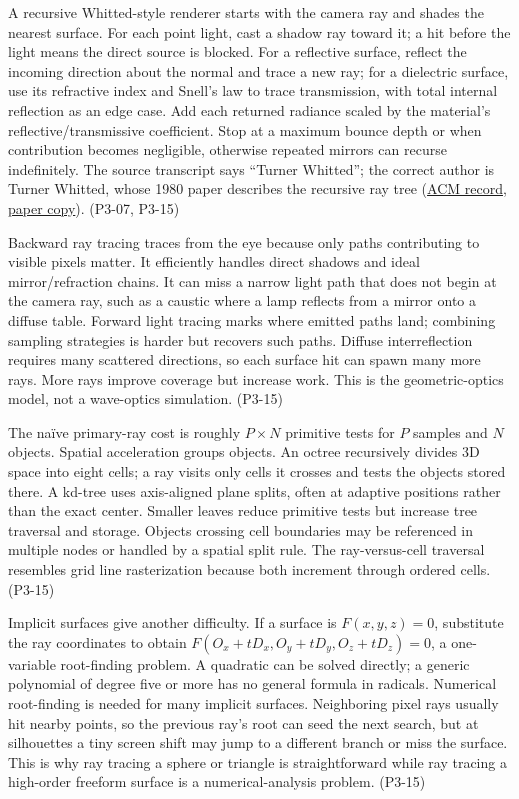 A recursive Whitted-style renderer starts with the camera ray and shades the nearest surface. For each point light, cast a shadow ray toward it; a hit before the light means the direct source is blocked. For a reflective surface, reflect the incoming direction about the normal and trace a new ray; for a dielectric surface, use its refractive index and Snell's law to trace transmission, with total internal reflection as an edge case. Add each returned radiance scaled by the material's reflective/transmissive coefficient. Stop at a maximum bounce depth or when contribution becomes negligible, otherwise repeated mirrors can recurse indefinitely. The source transcript says ``Turner Whitted''; the correct author is Turner Whitted, whose 1980 paper describes the recursive ray tree (\href{https://doi.org/10.1145/358876.358882}{ACM record}, \href{https://my.eng.utah.edu/~cs6958/papers/p343-whitted.pdf}{paper copy}). (P3-07, P3-15)

Backward ray tracing traces from the eye because only paths contributing to visible pixels matter. It efficiently handles direct shadows and ideal mirror/refraction chains. It can miss a narrow light path that does not begin at the camera ray, such as a caustic where a lamp reflects from a mirror onto a diffuse table. Forward light tracing marks where emitted paths land; combining sampling strategies is harder but recovers such paths. Diffuse interreflection requires many scattered directions, so each surface hit can spawn many more rays. More rays improve coverage but increase work. This is the geometric-optics model, not a wave-optics simulation. (P3-15)

The naïve primary-ray cost is roughly \(P\times N\) primitive tests for \(P\) samples and \(N\) objects. Spatial acceleration groups objects. An octree recursively divides 3D space into eight cells; a ray visits only cells it crosses and tests the objects stored there. A kd-tree uses axis-aligned plane splits, often at adaptive positions rather than the exact center. Smaller leaves reduce primitive tests but increase tree traversal and storage. Objects crossing cell boundaries may be referenced in multiple nodes or handled by a spatial split rule. The ray-versus-cell traversal resembles grid line rasterization because both increment through ordered cells. (P3-15)

Implicit surfaces give another difficulty. If a surface is \(F(x,y,z)=0\), substitute the ray coordinates to obtain \(F(O_x+tD_x,O_y+tD_y,O_z+tD_z)=0\), a one-variable root-finding problem. A quadratic can be solved directly; a generic polynomial of degree five or more has no general formula in radicals. Numerical root-finding is needed for many implicit surfaces. Neighboring pixel rays usually hit nearby points, so the previous ray's root can seed the next search, but at silhouettes a tiny screen shift may jump to a different branch or miss the surface. This is why ray tracing a sphere or triangle is straightforward while ray tracing a high-order freeform surface is a numerical-analysis problem. (P3-15)

